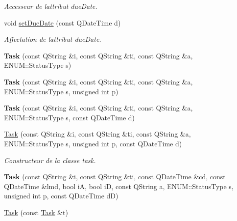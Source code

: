 \begin{DoxyCompactItemize}
\begin{DoxyCompactList}\small\item\em Accesseur de l\textquotesingle{}attribut due\+Date. \end{DoxyCompactList}\item 
void \hyperlink{class_task_a994b79a94eca42dc5d0de46122397659}{set\+Due\+Date} (const Q\+Date\+Time d)
\begin{DoxyCompactList}\small\item\em Affectation de l\textquotesingle{}attribut due\+Date. \end{DoxyCompactList}\item 
\mbox{\label{class_task_a78d0578c5477a26b89dc2db1dd4752e2}} 
{\bfseries Task} (const Q\+String \&i, const Q\+String \&ti, const Q\+String \&a, E\+N\+U\+M\+::\+Status\+Type s)
\item 
\mbox{\label{class_task_ac2c486f798fcdc263a77420448f9e276}} 
{\bfseries Task} (const Q\+String \&i, const Q\+String \&ti, const Q\+String \&a, E\+N\+U\+M\+::\+Status\+Type s, unsigned int p)
\item 
\mbox{\label{class_task_a95bb17f3748a1195967d92e73bba8c7c}} 
{\bfseries Task} (const Q\+String \&i, const Q\+String \&ti, const Q\+String \&a, E\+N\+U\+M\+::\+Status\+Type s, const Q\+Date\+Time d)
\item 
\hyperlink{class_task_a08a0f57803d8ef35f687f23f759e9f0c}{Task} (const Q\+String \&i, const Q\+String \&ti, const Q\+String \&a, E\+N\+U\+M\+::\+Status\+Type s, unsigned int p, const Q\+Date\+Time d)
\begin{DoxyCompactList}\small\item\em Constructeur de la classe task. \end{DoxyCompactList}\item 
\mbox{\label{class_task_a5e397a4f57e750bd8624debc2dba5f4a}} 
{\bfseries Task} (const Q\+String \&i, const Q\+String \&ti, const Q\+Date\+Time \&cd, const Q\+Date\+Time \&lmd, bool iA, bool iD, const Q\+String a, E\+N\+U\+M\+::\+Status\+Type s, unsigned int p, const Q\+Date\+Time dD)
\item 
\mbox{\label{class_task_a0aec5018915f11c96398b75f969a3220}} 
\hyperlink{class_task_a0aec5018915f11c96398b75f969a3220}{Task} (const \hyperlink{class_task}{Task} \&t)

\end{DoxyCompactItemize}
